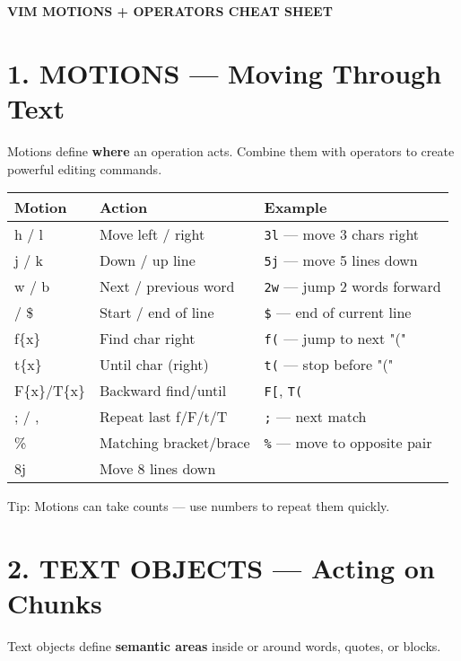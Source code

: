 \documentclass[landscape,11pt]{article}
\begin{document}
\begin{center}
{\Huge \textbf{VIM MOTIONS + OPERATORS CHEAT SHEET}}\\[5mm]
\end{center}

\begin{multicols}{2}

\section*{\textcolor{OliveGreen}{1. MOTIONS — Moving Through Text}}
Motions define \textbf{where} an operation acts. Combine them with operators to create powerful editing commands.

\renewcommand{\arraystretch}{1.1}
\begin{tabularx}{\linewidth}{@{}>{\ttfamily}l>{\raggedright\arraybackslash}X>{\raggedright\arraybackslash}X@{}}
\normalfont\textbf{Motion} & \textbf{Action} & \textbf{Example}\\
\hline
h / l & Move left / right & \texttt{3l} — move 3 chars right\\
j / k & Down / up line & \texttt{5j} — move 5 lines down\\
w / b & Next / previous word & \texttt{2w} — jump 2 words forward\\
0 / \$ & Start / end of line & \texttt{\$} — end of current line\\
f\{x\} & Find char right & \texttt{f(} — jump to next "("\\
t\{x\} & Until char (right) & \texttt{t(} — stop before "("\\
F\{x\}/T\{x\} & Backward find/until & \texttt{F[}, \texttt{T(}\\
; / , & Repeat last f/F/t/T & \texttt{;} — next match\\
\% & Matching bracket/brace & \texttt{\%} — move to opposite pair\\
8j & Move 8 lines down &  \\
\end{tabularx}
\renewcommand{\arraystretch}{1}

\vspace{2mm}
\begin{tcolorbox}[colback=OliveGreen!8, colframe=OliveGreen, boxsep=2pt, arc=1pt, fontupper=\small\itshape]
Tip: Motions can take counts — use numbers to repeat them quickly.
\end{tcolorbox}

\section*{\textcolor{YellowOrange}{2. TEXT OBJECTS — Acting on Chunks}}
Text objects define \textbf{semantic areas} inside or around words, quotes, or blocks.


\end{multicols}
\end{document}
